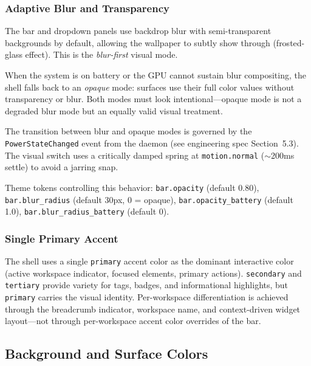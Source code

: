 \documentclass[11pt,a4paper]{article}
\begin{document}
\subsubsection{Adaptive Blur and Transparency}

The bar and dropdown panels use backdrop blur with semi-transparent backgrounds by default, allowing the wallpaper to subtly show through (frosted-glass effect). This is the \emph{blur-first} visual mode.

When the system is on battery or the GPU cannot sustain blur compositing, the shell falls back to an \emph{opaque} mode: surfaces use their full color values without transparency or blur. Both modes must look intentional---opaque mode is not a degraded blur mode but an equally valid visual treatment.

The transition between blur and opaque modes is governed by the \texttt{PowerStateChanged} event from the daemon (see engineering spec Section~5.3). The visual switch uses a critically damped spring at \texttt{motion.normal} ($\sim$200ms settle) to avoid a jarring snap.

Theme tokens controlling this behavior: \texttt{bar.opacity} (default 0.80), \texttt{bar.blur\_radius} (default 30px, 0 = opaque), \texttt{bar.opacity\_battery} (default 1.0), \texttt{bar.blur\_radius\_battery} (default 0).

\subsubsection{Single Primary Accent}

The shell uses a single \texttt{primary} accent color as the dominant interactive color (active workspace indicator, focused elements, primary actions). \texttt{secondary} and \texttt{tertiary} provide variety for tags, badges, and informational highlights, but \texttt{primary} carries the visual identity. Per-workspace differentiation is achieved through the breadcrumb indicator, workspace name, and context-driven widget layout---not through per-workspace accent color overrides of the bar.

\subsection{Background and Surface Colors}
\end{document}
